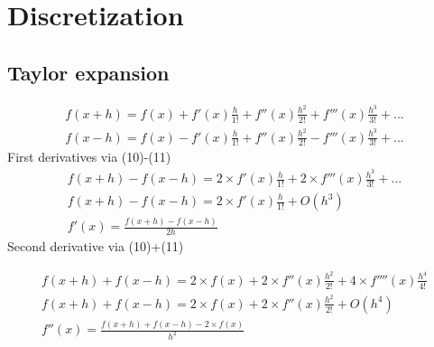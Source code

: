 \documentclass[11pt,dvips]{article}
\numberwithin{equation}{section}
\begin{document}
\section{Discretization}
\subsection{Taylor expansion} 
\begin{align*}
f(x+h)=f(x)+f'(x)\frac{h}{1!}+f''(x)\frac{h^2}{2!}+f'''(x)\frac{h^3}{3!}+... \label{10} \\
f(x-h)=f(x)-f'(x)\frac{h}{1!}+f''(x)\frac{h^2}{2!}-f'''(x)\frac{h^3}{3!}+... \label{11} 
\end{align*}
First derivatives via (10)-(11)
\begin{align*}
f(x+h)-f(x-h)=2\times f'(x)\frac{h}{1!}+2 \times f'''(x)\frac{h^3}{3!}+... \\
f(x+h)-f(x-h)=2\times f'(x)\frac{h}{1!}+O(h^3) \\
f'(x)=\frac{f(x+h)-f(x-h)}{2h} 
\label{12}
\end{align*}
Second derivative via (10)+(11)

\begin{align*}
f(x+h)+f(x-h)=2\times f(x)+2 \times f''(x)\frac{h^2}{2!}+4 \times f''''(x)\frac{h^4}{4!} \\
f(x+h)+f(x-h)=2\times f(x)+2 \times f''(x)\frac{h^2}{2!}+O(h^4) \\
f''(x)=\frac{f(x+h)+f(x-h)-2\times f(x)}{h^2}
\label{13}
\end{align*}
\end{document}
